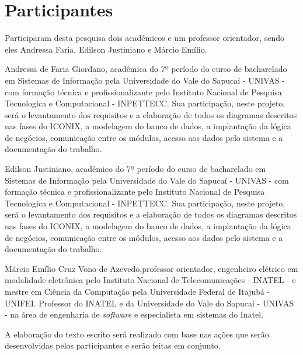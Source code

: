 \section{Participantes}

\par Participaram desta pesquisa dois acadêmicos e um professor orientador, sendo eles Andressa Faria, Edilson Justiniano e Márcio Emílio.
\par Andressa de Faria Giordano, acadêmica do 7º período do curso de bacharelado em Sistemas de Informação pela Universidade do Vale do Sapucaí - UNIVAS - com formação técnica e profissionalizante pelo Instituto Nacional de Pesquisa Tecnologica e Computacional - INPETTECC. Sua participação, neste projeto, será o levantamento dos requisitos e a elaboração de todos os diagramas descritos nas fases do ICONIX, a modelagem do banco de dados, a implantação da lógica de negócios, comunicação entre os módulos, acesso aos dados pelo sistema e a documentação do trabalho.

\par  Edilson Justiniano, acadêmico do 7º período do curso de bacharelado em Sistemas de Informação pela Universidade do Vale do Sapucaí - UNIVAS - com formação técnica e profissionalizante pelo Instituto Nacional de Pesquisa Tecnologica e Computacional - INPETTECC. Sua participação, neste projeto, será o levantamento dos requisitos e a elaboração de todos os diagramas descritos nas fases do ICONIX, a modelagem do banco de dados, a implantação da lógica de negócios, comunicação entre os módulos, acesso aos dados pelo sistema e a documentação do trabalho.

\par Márcio Emílio Cruz Vono de Azevedo,professor orientador, engenheiro elétrico em modalidade eletrônica pelo Instituto Nacional de Telecomunicações - INATEL - e mestre em Ciência da Computação pela Universidade Federal de Itajubá - UNIFEI. Professor do INATEL e da Universidade do Vale do Sapucaí - UNIVAS - na área de engenharia de \textit{software} e especialista em sistemas do Inatel.


\par A elaboração do texto escrito será realizado com base nas ações que serão desenvolvidas pelos participantes e serão feitas em conjunto.
